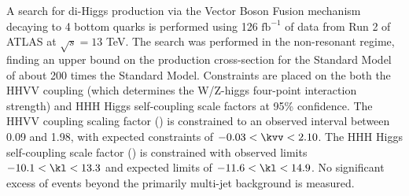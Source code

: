 A search for di-Higgs production via the Vector Boson Fusion mechanism
    decaying to 4 bottom quarks is performed using 
    126 $\textrm{fb}^{-1}$ of data from Run 2 of ATLAS at $\sqrt{s}=13$ TeV.
The search was performed in the non-resonant regime,
    finding an upper bound on the production cross-section
    for the Standard Model \vbfhhproc of about 200 times the Standard Model.
Constraints are placed on the both the HHVV coupling
    (which determines the W/Z-higgs four-point interaction strength)
    and HHH Higgs self-coupling scale factors at 95\% confidence.
The HHVV coupling scaling factor (\kvv) is constrained
    to an observed interval between 0.09 and 1.98,
    with expected constraints of $-0.03 < \kvv < 2.10$.
The HHH Higgs self-coupling scale factor (\kl) is constrained
    with observed limits $-10.1 < \kl < 13.3$
    and expected limits of $-11.6 < \kl < 14.9$.
No significant excess of events beyond the primarily multi-jet background is measured.
